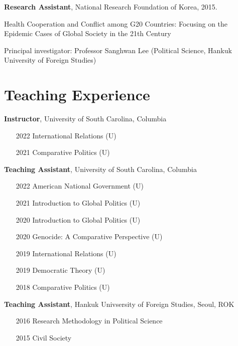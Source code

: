 \documentclass[margin,line]{res}
\begin{document}
\begin{resume}
\vspace{-.1cm}
{\bf Research Assistant}, National Research Foundation of Korea, 2015.

\vspace{-.43cm}
Health Cooperation and Conflict among G20 Countries: Focusing on the Epidemic Cases of Global Society in the 21th Century

\vspace{-.43cm}
Principal investigator: Professor Sanghwan Lee \small{(Political Science, Hankuk University of Foreign Studies)}

\section{\sc Teaching Experience} 

{\bf Instructor}, University of South Carolina, Columbia
\vspace{-.55cm}
\begin{itemize} \itemsep -0.3mm 
	\item[2022] International Relations (U)
	\item[2021] Comparative Politics (U)
\end{itemize}
\vspace{-.3cm}
{\bf Teaching Assistant}, University of South Carolina, Columbia
\vspace{-.55cm}
\begin{itemize} \itemsep -0.3mm 
	\item[2022] American National Government (U)
	\item[2021] Introduction to Global Politics (U)
	\item[2020] Introduction to Global Politics (U)
	\item[2020] Genocide: A Comparative Perspective (U)
	\item[2019] International Relations (U)
	\item[2019] Democratic Theory (U)
	\item[2018] Comparative Politics (U)
\end{itemize}
\vspace{-.3cm}
{\bf Teaching Assistant}, Hankuk Univsersity of Foreign Studies, Seoul, ROK
\vspace{-.55cm}
\begin{itemize} \itemsep -0.3mm 
	\item[2016] Research Methodology in Political Science
	\item[2015] Civil Society
\end{itemize}


\end{resume}
\end{document}
